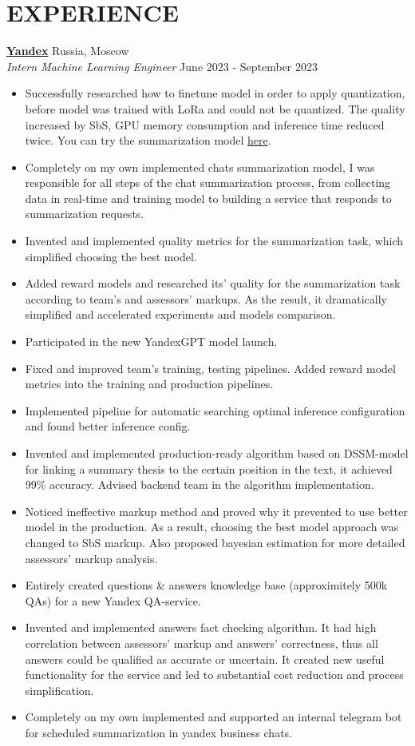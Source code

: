 \section*{EXPERIENCE}

\noindent
\textbf{\href{https://yandex.com}{Yandex}} \hfill Russia, Moscow\\ 
\textit{Intern Machine Learning Engineer} \hfill June 2023 - September 2023 
\begin{itemize}
\item Successfully researched how to finetune model in order to apply quantization, before model was trained with LoRa and could not be quantized. The quality increased by SbS, GPU memory consumption and inference time reduced twice. You can try the summarization model \href{https://300.ya.ru}{here}.
\item Completely on my own implemented chats summarization model, I was responsible for all steps of the chat summarization process, from collecting data in real-time and training model to building a service that responds to summarization requests.
\item Invented and implemented quality metrics for the summarization task, which simplified choosing the best model.
\item Added reward models and researched its' quality for the summarization task according to team's and assessors' markups. As the result, it dramatically simplified and accelerated experiments and models comparison.
\item Participated in the new YandexGPT model launch.  
\item Fixed and improved team's training, testing pipelines. Added reward model metrics into the training and production pipelines. 
\item Implemented pipeline for automatic searching optimal inference configuration and found better inference config.
\item Invented and implemented production-ready algorithm based on DSSM-model for linking a summary thesis to the certain position in the text, it achieved 99\% accuracy. Advised backend team in the algorithm implementation.
\item Noticed ineffective markup method and proved why it prevented to use better model in the production. As a result, choosing the best model approach was changed to SbS markup. Also proposed bayesian estimation for more detailed assessors' markup analysis.
\item Entirely created questions \& answers knowledge base (approximitely 500k QAs) for a new Yandex QA-service.
\item Invented and implemented answers fact checking algorithm. It had high correlation between assessors' markup and answers' correctness, thus all answers could be qualified as accurate or uncertain. It created new useful functionality for the service and led to substantial cost reduction and process simplification.
\item Completely on my own implemented and supported an internal telegram bot for scheduled summarization in yandex business chats.
\end{itemize}


